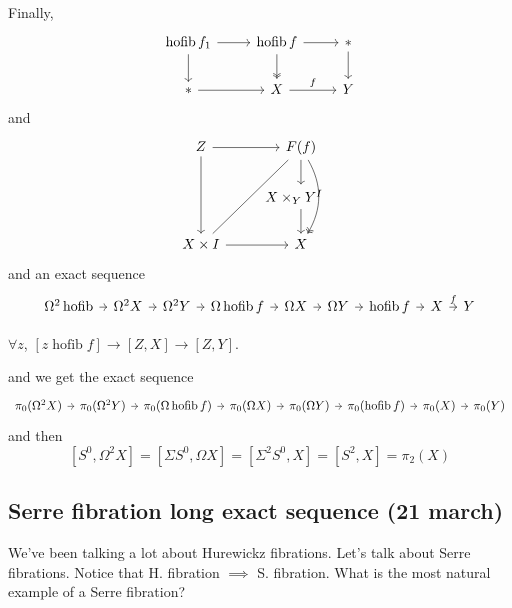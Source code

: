\documentclass{article}
\DeclareMathOperator{\hofib}{hofib}
\begin{document}
Finally,
\[\begin{tikzcd}
	\hofib f_1\arrow[r]\arrow[d]&\hofib f\arrow[d,two heads]\arrow[r]&*\arrow[d]\\
	*\arrow[r]&X\arrow[r,"f"]&Y
\end{tikzcd}\]
and
\[\begin{tikzcd}
	Z\arrow[dd]\arrow[r]&F(f)\arrow[d]\arrow[dd,bend left,two heads]\\
	&X\times_YY^I\quad\arrow[d]\\
	X\times I\arrow[r]\arrow[uur,dash]&X
\end{tikzcd}\]
and an exact sequence
\[\begin{tikzcd}[column sep=tiny]
	\Omega^2\hofib\arrow[r]&\Omega^2X\arrow[r]&\Omega^2Y\arrow[r]&\Omega\hofib f\arrow[r]&\Omega X\arrow[r]&\Omega Y\arrow[r]&\hofib f\arrow[r]&X\arrow[r,"f"]&Y
\end{tikzcd}\]
\begin{lemma}[Exactness]
	$\forall z$, $[z\hofib f]\to[Z,X]\to[Z,Y]$.
\end{lemma}
and we get the exact sequence
\[\begin{tikzcd}[column sep=tiny]
	\pi_0(\Omega^2X)\arrow[r]&\pi_0(\Omega^2Y)\arrow[r]&\pi_0(\Omega\hofib f)\arrow[r]&\pi_0(\Omega X)\arrow[r]&\pi_0(\Omega Y)\arrow[r]&\pi_0(\hofib f)\arrow[r]&\pi_0(X)\arrow[r]&\pi_0(Y)
\end{tikzcd}\]
and then
\[[S^0,\Omega^2X]=[\Sigma S^0,\Omega X]=[\Sigma^2 S^0,X]=[S^2,X]=\pi_2(X)\]


\subsection{Serre fibration long exact sequence (21 march)}

We've been talking a lot about Hurewickz fibrations. Let's talk about Serre fibrations. Notice that H. fibration $\implies$ S. fibration. What is the most natural example of a Serre fibration?
\end{document}
